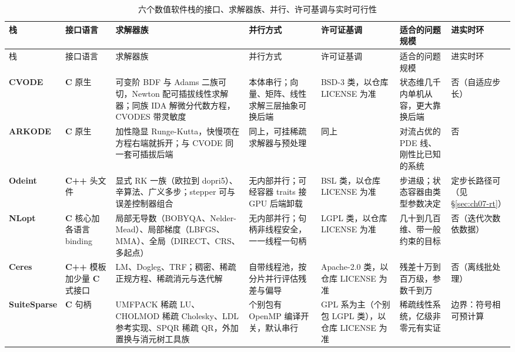 \documentclass[12pt,a4paper,fontset=fandol]{ctexbook}
\newcommand{\Bk}{\allowbreak}
\newcommand{\Lib}[1]{\textbf{#1}}
\newcommand{\Lang}[1]{\textsf{\bfseries #1}}
\newcommand{\CL}{\Lang{C}}
\newcommand{\CPP}{\Lang{C++}}
\begin{document}
\begin{longtable}{@{}>{\raggedright\arraybackslash}p{}
  >{\raggedright\arraybackslash}p{}
  >{\raggedright\arraybackslash}p{}
  >{\raggedright\arraybackslash}p{}
  >{\raggedright\arraybackslash}p{}
  >{\raggedright\arraybackslash}p{}
  >{\raggedright\arraybackslash}p{}@{}}
\caption{六个数值软件栈的接口、求解器族、并行、许可基调与实时可行性}\label{tab:ch07-stack}\\
\toprule
栈 & 接口语言 & 求解器族 & 并行方式 & 许可证基调 & 适合的问题规模 & 进实时环 \\
\midrule
\endfirsthead
\toprule
栈 & 接口语言 & 求解器族 & 并行方式 & 许可证基调 & 适合的问题规模 & 进实时环 \\
\midrule
\endhead
\Lib{CVODE} & \CL{} 原生 & 可变阶 BDF 与 Adams 二族可切，Newton 配可插拔线性求解器；同族 IDA 解微分代数方程，CVODES 带灵敏度 &
  本体串行；向量、矩阵、线性求解三层抽象可换后端 &
  BSD-3 类，以仓库 LICENSE 为准 &
  状态维几千内单机从容，更大靠换后端 &
  否（自适应步长） \\
\Lib{ARKODE} & \CL{} 原生 & 加性隐显 Runge-Kutta，快慢项在方程右端就拆开；与 CVODE 同一套可插拔后端 &
  同上，可挂稀疏求解器与预处理 &
  同上 &
  对流占优的 PDE 线、刚性比已知的系统 &
  否 \\
\Lib{Odeint} & \CPP{} 头文件 & 显式 RK 一族（欧拉到 dopri5）、辛算法、广义多步；stepper 可与误差控制器组合 &
  无内部并行；可经容器 traits 接 GPU 后端卸载 &
  BSL 类，以仓库 LICENSE 为准 &
  步进级；状态容器由类型参数决定 &
  定步长路径可（见 \S\ref{sec:ch07-rt}） \\
\Lib{NLopt} & \CL{} 核心加各语言 binding & 局部无导数（BOBYQA、Nelder-Mead）、局部梯度（LBFGS、MMA）、全局（DIRECT、CRS、多起点） &
  无内部并行；句柄非线程安全，一一线程一句柄 &
  LGPL 类，以仓库 LICENSE 为准 &
  几十到几百维、带一般约束的目标 &
  否（迭代次数依数据） \\
\Lib{Ceres} & \CPP{} 模板加少量 \CL{} 式接口 & LM、Dogleg、TRF；稠密、稀疏正规方程、稀疏消元与迭代解 &
  自带线程池，按分片并行评估残差与偏导 &
  Apache-2.0 类，以仓库 LICENSE 为准 &
  残差十万到百万级，参数千到万 &
  否（离线批处理） \\
\Lib{Suite\Bk Sparse} & \CL{} 句柄 & UMFPACK 稀疏 LU、CHOLMOD 稀疏 Cholesky、LDL 参考实现、SPQR 稀疏 QR，外加置换与消元树工具族 &
  个别包有 OpenMP 编译开关，默认串行 &
  GPL 系为主（个别包 LGPL 类），以仓库 LICENSE 为准 &
  稀疏线性系统，亿级非零元有实证 &
  边界：符号相可预计算 \\
\bottomrule
\end{longtable}
\end{document}
